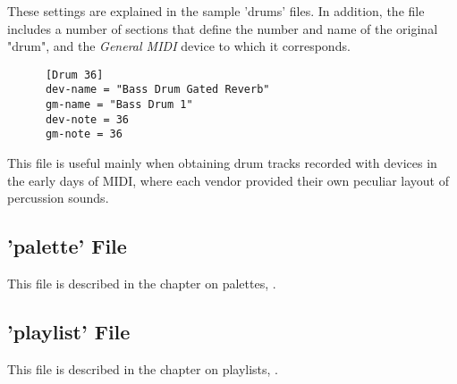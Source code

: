    These settings are explained in the sample 'drums' files.  In addition, the
   file includes a number of sections that define the number and name of the
   original "drum", and the \textsl{General MIDI} device to which it
   corresponds.

   \begin{verbatim}
      [Drum 36]
      dev-name = "Bass Drum Gated Reverb"
      gm-name = "Bass Drum 1"
      dev-note = 36
      gm-note = 36
   \end{verbatim}

   This file is useful mainly when obtaining drum tracks recorded with devices in
   the early days of MIDI, where each vendor provided their own peculiar layout of
   percussion sounds.

\subsection{'palette' File}
\label{subsec:configuration_palette}

   This file is described in the chapter on palettes, .

\subsection{'playlist' File}
\label{subsec:configuration_playlist}

   This file is described in the chapter on playlists, .

